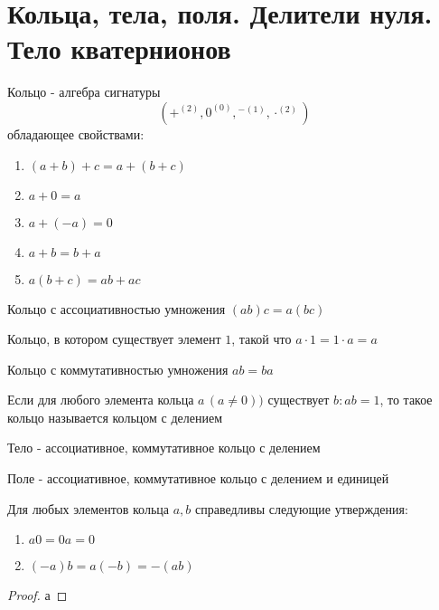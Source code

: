 \documentclass[../main/document.tex]{subfiles}
\begin{document}
\section{Кольца, тела, поля. Делители нуля. Тело кватернионов}
\begin{dfn}[Кольцо]
Кольцо - алгебра сигнатуры
$$(+^{(2)},0^{(0)},{{}^{-}}^{(1)},\cdot^{(2)})$$
обладающее свойствами:
\begin{enumerate}
\item $(a+b)+c=a+(b+c)$
\item $a+0=a$
\item $a+(-a)=0$
\item $a+b=b+a$
\item $a(b+c)=ab+ac$
\end{enumerate}
\end{dfn}
\begin{dfn}
Кольцо с ассоциативностью умножения $(ab)c=a(bc)$
\end{dfn}
\begin{dfn}
Кольцо, в котором существует элемент $1$, такой что $a\cdot 1=1\cdot a=a$
\end{dfn}
\begin{dfn}
Кольцо с коммутативностью умножения $ab=ba$
\end{dfn}
\begin{dfn}
Если для любого элемента кольца $a\,(a\neq 0))$ существует $b:ab=1$, то такое кольцо называется кольцом с делением
\end{dfn}
\begin{dfn}[Тело]
Тело - ассоциативное, коммутативное кольцо с делением
\end{dfn}
\begin{dfn}[Поле]
Поле - ассоциативное, коммутативное кольцо с делением и единицей
\end{dfn}
\begin{exm}

\end{exm}
\begin{thm}
Для любых элементов кольца $a,b$ справедливы следующие утверждения:
\begin{enumerate}
\item $a0=0a=0$
\item $(-a)b=a(-b)=-(ab)$
\end{enumerate}
\begin{proof}
а
\end{proof}
\end{thm}
\end{document}
